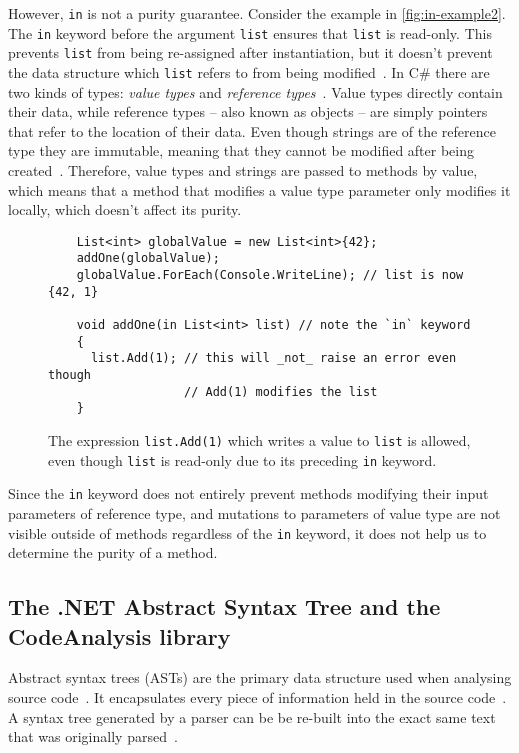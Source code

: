 \documentclass[a4paper,12pt]{article}
\begin{document}
However, \texttt{in} is not a purity guarantee. Consider the example in \autoref{fig:in-example2}. The \texttt{in} keyword before the argument \texttt{list} ensures that \texttt{list} is read-only. This prevents \texttt{list} from being re-assigned after instantiation, but it doesn't prevent the data structure which \texttt{list} refers to from being modified~\cite{buchanan-static-lists}. In C\# there are two kinds of types: \textit{value types} and \textit{reference types}~\cite{microsoft-types}. Value types directly contain their data, while reference types -- also known as objects -- are simply pointers that refer to the location of their data.  Even though strings are of the reference type they are immutable, meaning that they cannot be modified after being created~\cite{microsoft-strings}. Therefore, value types and strings are passed to methods by value, which means that a method that modifies a value type parameter only modifies it locally, which doesn't affect its purity.

\begin{figure}[H]
  \centering
  \begin{lstlisting}
    List<int> globalValue = new List<int>{42};
    addOne(globalValue);
    globalValue.ForEach(Console.WriteLine); // list is now {42, 1}

    void addOne(in List<int> list) // note the `in` keyword
    {
      list.Add(1); // this will _not_ raise an error even though
                   // Add(1) modifies the list
    }
  \end{lstlisting}
  \caption{The expression \texttt{list.Add(1)} which writes a value to \texttt{list} is allowed, even though \texttt{list} is read-only due to its preceding \texttt{in} keyword.}
  \label{fig:in-example2}
\end{figure}

Since the \texttt{in} keyword does not entirely prevent methods modifying their input parameters of reference type, and mutations to parameters of value type are not visible outside of methods regardless of the \texttt{in} keyword, it does not help us to determine the purity of a method.

\subsection{The .NET Abstract Syntax Tree and the CodeAnalysis library} \label{The .NET Abstract Syntax Tree and the CodeAnalysis library}

Abstract syntax trees (ASTs) are the primary data structure used when analysing source code~\cite{microsoft-work-with-syntax}. It encapsulates every piece of information held in the source code~\cite{microsoft-work-with-syntax}. A syntax tree generated by a parser can be be re-built into the exact same text that was originally parsed~\cite{microsoft-work-with-syntax}.
\end{document}
